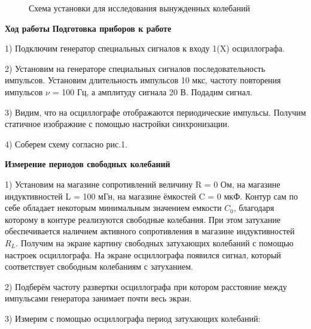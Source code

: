 \documentclass[a4paper,12pt]{article}
\begin{document}
\begin{figure}
\caption{Схема установки для исследования вынужденных колебаний}
\end{figure}

\textbf{Ход работы}
\textbf{Подготовка приборов к работе}

\par 1) Подключим генератор специальных сигналов к входу 1(X) осциллографа. \\
\par 2) Установим на генераторе специальных сигналов последовательность импульсов. Установим длительность импульсов 10 мкс, частоту повторения импульсов $\nu$ = 100 Гц, а амплитуду сигнала 20 В. Подадим сигнал.\\
\par 3) Видим, что на осциллографе отображаются периодические импульсы. Получим статичное изображние с помощью настройки синхронизации. \\
\par 4) Соберем схему согласно рис.1.

\textbf{Измерение периодов свободных колебаний}

\par 1) Установим на магазине сопротивлений величину R = 0 Ом, на магазине индуктивностей L = 100 мГн, на магазине ёмкостей C = 0 мкФ. Контур сам по себе обладает некоторым минимальным значением емкости $C_0$, благодаря которому в контуре реализуются свободные колебания. При этом затухание обеспечивается наличием активного сопротивления в магазине индуктивностей $R_L$. Получим на экране картину свободных затухающих колебаний с помощью настроек осциллографа. На экране осциллографа появился сигнал, который соответствует свободным колебаниям с затуханием. \\ 

\par 2) Подберём частоту развертки осциллографа при котором расстояние между импульсами генератора занимает почти весь экран. \\
\par 3) Измерим с помощью осциллографа период затухающих колебаний:\\
\end{document}
